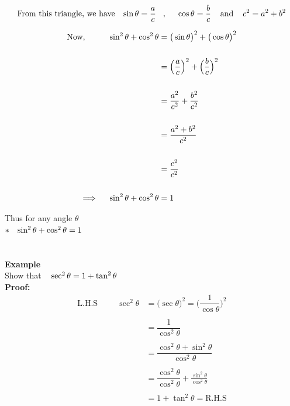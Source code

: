 \documentclass[11pt,a4paper]{article}
\begin{document}
$$\text{From this triangle, we have}\hspace{0.3cm}\sin \theta = \dfrac{a}{c}\hspace{0.3cm}, \hspace{0.5cm} \cos \theta = \dfrac{b}{c}\hspace{0.4cm}\text{and}\hspace{0.4cm} c^2 = a^2 + b^2$$

\begin{align*}
\text{Now},\hspace{1cm} \sin^2\theta + \cos^2\theta & = \big(\sin\theta\big)^2 + \big(\cos\theta\big)^2\\\\
& = \Big(\dfrac{a}{c}\Big)^2 + \Big(\dfrac{b}{c}\Big)^2\\\\
& = \dfrac{a^2}{c^2} + \dfrac{b^2}{c^2}\\\\
& = \dfrac{a^2 + b^2}{c^2}\\\\
& = \dfrac{c^2}{c^2}\\\\
\implies\hspace{0.4cm} \sin^2\theta + \cos^2\theta & = 1
\end{align*}


Thus for any angle $\theta$\\

$*\hspace{0.3cm}\sin^2\theta + \cos^2\theta = 1$\\\\\\






\textbf{Example}\\
Show that $\hspace{0.3cm} \sec^2\theta = 1 + \tan^2\theta$\\

\textbf{Proof:}\\


\begin{align*}
\text{L.H.S}\hspace{1cm} \sec^2 \theta & = \big(\sec\theta\big)^2 = \Big(\dfrac{1}{\cos\theta}\Big)^2\\\\
& = \dfrac{1}{\cos^2\theta}\\\\
& = \dfrac{\cos^2\theta + \sin^2\theta}{\cos^2\theta}\\\\
& = \dfrac{\cos^2\theta}{\cos^2\theta} + \frac{\sin^2\theta}{\cos^2\theta}\\\\
& = 1 + \tan^2\theta = \text{R.H.S}\\
\end{align*}
\end{document}
